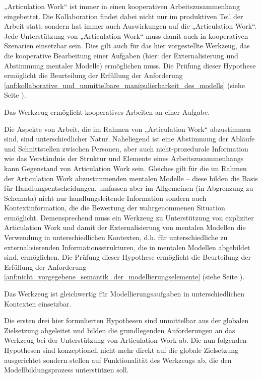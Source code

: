 „Articulation Work“ ist immer in einen kooperativen Arbeitszusammenhang eingebettet. Die Kollaboration findet dabei nicht nur im produktiven Teil der Arbeit statt, sondern hat immer auch Auswirkungen auf die „Articulation Work“. Jede Unterstützung von „Articulation Work“ muss damit auch in kooperativen Szenarien einsetzbar sein. Dies gilt auch für das hier vorgestellte Werkzeug, das die kooperative Bearbeitung einer Aufgaben (hier: der Externalisierung und Abstimmung mentaler Modelle) ermöglichen muss. Die Prüfung dieser Hypothese ermöglicht die Beurteilung der Erfüllung der Anforderung \ref{anf:kollaborative_und_unmittelbare_manipulierbarkeit_des_modells} (siehe Seite \pageref{anf:kollaborative_und_unmittelbare_manipulierbarkeit_des_modells}).

\begin{hyp}
	\label{hyp:kollaborativ}
	Das Werkzeug ermöglicht kooperatives Arbeiten an einer Aufgabe.
\end{hyp}

Die Aspekte von Arbeit, die im Rahmen von „Articulation Work“ abzustimmen sind, sind unterschiedlicher Natur. Naheliegend ist eine Abstimmung der Abläufe und Schnittstellen zwischen Personen, aber auch nicht-prozedurale Information wie das Verständnis der Struktur und Elemente eines Arbeitszusammenhangs kann Gegenstand von Articulation Work sein. Gleiches gilt für die im Rahmen der Articulation Work abzustimmenden mentalen Modelle -- diese bilden die Basis für Handlungsentscheidungen, umfassen aber im Allgemeinen (in Abgrenzung zu Schemata) nicht nur handlungsleitende Information sondern auch Kontextinformation, die die Bewertung der wahrgenommenen Situation ermöglicht. Demensprechend muss ein Werkzeug zu Unterstützung von expliziter Articulation Work und damit der Externalisierung von mentalen Modellen die Verwendung in unterschiedlichen Kontexten, d.h. für unterschiedliche zu externalisierenden Informationsstrukturen, die in mentalen Modellen abgebildet sind, ermöglichen. Die Prüfung dieser Hypothese ermöglicht die Beurteilung der Erfüllung der Anforderung \ref{anf:nicht_vorgegebene_semantik_der_modellierungselemente} (siehe Seite \pageref{anf:nicht_vorgegebene_semantik_der_modellierungselemente}).

\begin{hyp}
	\label{hyp:kontexte}
	Das Werkzeug ist gleichwertig für Modellierungsaufgaben in unterschiedlichen Kontexten einsetzbar.
\end{hyp}

Die ersten drei hier formulierten Hypothesen sind unmittelbar aus der globalen Zielsetzung abgeleitet und bilden die grundlegenden Anforderungen an das Werkzeug bei der Unterstützung von Articulation Work ab. Die nun folgenden Hypothesen sind konzeptionell nicht mehr direkt auf die globale Zielsetzung ausgerichtet sondern stellen auf Funktionalität des Werkzeugs ab, die den Modellbildungsprozess unterstützen soll. 

